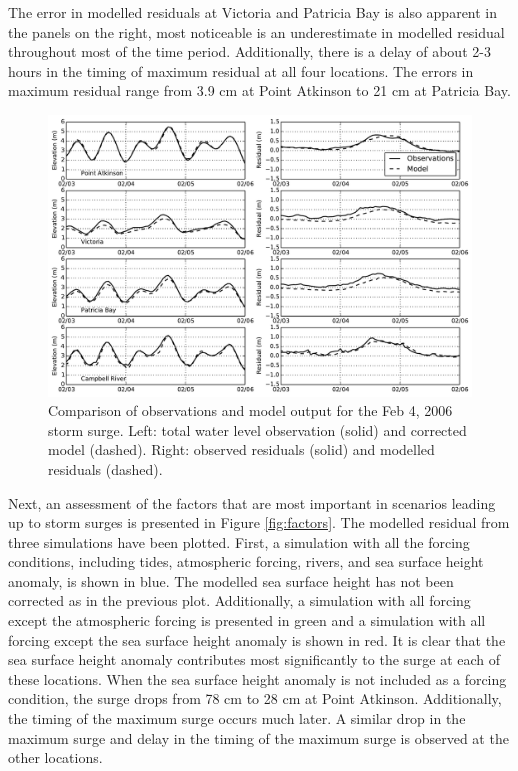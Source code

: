 \documentclass[pdftex,10pt]{article}
\begin{document}
The error in modelled residuals at Victoria and Patricia Bay is also apparent in the panels on the right, most noticeable is an underestimate in modelled residual throughout most of the time period. Additionally, there is a delay of about 2-3 hours in the timing of maximum residual at all four locations. The errors in maximum residual range from 3.9 cm at Point Atkinson to 21 cm at Patricia Bay. 


\begin{figure}
\centering
\includegraphics[scale=0.6]{Figures/feb2006.pdf}
\caption{Comparison of observations and model output for the Feb 4, 2006 storm surge. Left: total water level observation (solid) and corrected model (dashed). Right: observed residuals (solid) and modelled residuals (dashed).}
\label{fig:feb2006}
\end{figure}

Next, an assessment of the factors that are most important in scenarios leading up to storm surges is presented in Figure \ref{fig:factors}. The modelled residual from three simulations have been plotted. First, a simulation with all the forcing conditions, including tides, atmospheric forcing, rivers, and sea surface height anomaly, is shown in blue. The modelled sea surface height has not been corrected as in the previous plot. Additionally, a simulation with all forcing except the atmospheric forcing is presented in green and a simulation with all forcing except the sea surface height anomaly is shown in red. It is clear that the sea surface height anomaly contributes most significantly to the surge at each of these locations. When the sea surface height anomaly is not included as a forcing condition, the surge drops from 78 cm to 28 cm at Point Atkinson. Additionally, the timing of the maximum surge occurs much later. A similar drop in the maximum surge and delay in the timing of the maximum surge is observed at the other locations. 
\end{document}
